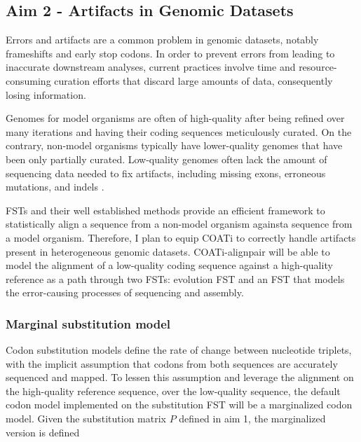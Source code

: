 \subsection{Aim 2 - Artifacts in Genomic Datasets}

Errors and artifacts are a common problem in genomic datasets, notably
frameshifts and early stop codons.
In order to prevent errors from leading to inaccurate downstream analyses,
current practices involve time and resource-consuming curation efforts that
discard large amounts of data, consequently losing information.

Genomes for model organisms are often of high-quality after being refined over
many iterations and having their coding sequences meticulously curated.
On the contrary, non-model organisms typically have lower-quality genomes that
have been only partially curated.
Low-quality genomes often lack the amount of sequencing data needed to fix
artifacts, including missing exons, erroneous mutations, and indels
\parencite{jackman2018tigmint}.

FSTs and their well established methods provide an efficient framework to
statistically align a sequence from a non-model organism againsta sequence from
a model organism.
Therefore, I plan to equip COATi to correctly handle artifacts present in
heterogeneous genomic datasets.
COATi-alignpair will be able to model the alignment of a low-quality coding
sequence against a high-quality reference as a path through two FSTs: evolution
FST and an FST that models the error-causing processes of sequencing and
assembly.

\subsubsection{Marginal substitution model}


Codon substitution models define the rate of change between nucleotide triplets,
with the implicit assumption that codons from both sequences are accurately
sequenced and mapped.
To lessen this assumption and leverage the alignment on the high-quality
reference sequence, over the low-quality sequence, the default codon model
implemented on the substitution FST will be a marginalized codon model.
Given the substitution matrix $P$ defined in aim 1, the marginalized version is
defined

